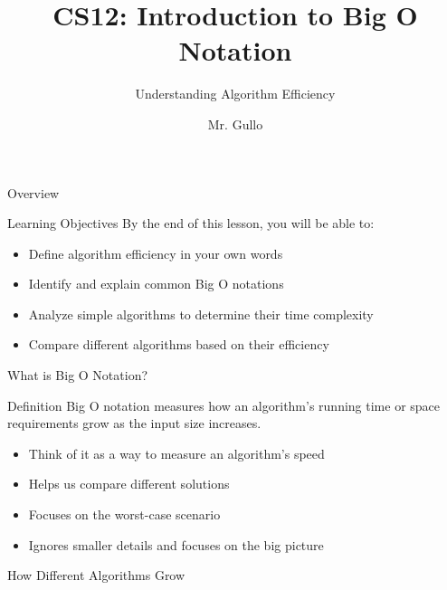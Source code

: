 \documentclass{beamer}
\title[Big O Notation]{CS12: Introduction to Big O Notation}
\subtitle{Understanding Algorithm Efficiency}
\author[Mr. Gullo]{Mr. Gullo}
\date{}
\begin{document}
\begin{frame}
    \titlepage
\end{frame}

\begin{frame}{Overview}
    \tableofcontents
\end{frame}

\begin{frame}{Learning Objectives}
    By the end of this lesson, you will be able to:
    \begin{itemize}
        \item Define algorithm efficiency in your own words
        \item Identify and explain common Big O notations
        \item Analyze simple algorithms to determine their time complexity
        \item Compare different algorithms based on their efficiency
    \end{itemize}
\end{frame}

\begin{frame}{What is Big O Notation?}
    \begin{block}{Definition}
        Big O notation measures how an algorithm's running time or space requirements grow as the input size increases.
    \end{block}
    
    \begin{itemize}
        \item Think of it as a way to measure an algorithm's speed
        \item Helps us compare different solutions
        \item Focuses on the worst-case scenario
        \item Ignores smaller details and focuses on the big picture
    \end{itemize}
\end{frame}

\begin{frame}{How Different Algorithms Grow}
    \begin{center}
    \end{center}
\end{frame}
\end{document}
